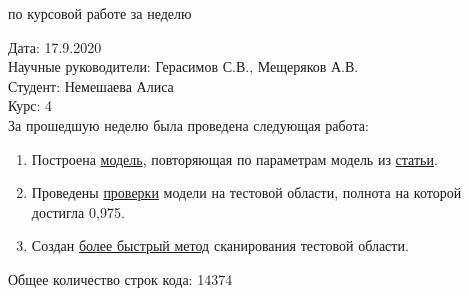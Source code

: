 \documentclass{article}
\begin{document}
\begin{center}{ по курсовой работе за неделю\\}\end{center}
Дата: 17.9.2020\\
Научные руководители: Герасимов С.В., Мещеряков А.В.\\
Студент: Немешаева Алиса\\
Курс: 4\\

\renewcommand{\labelitemi}{$\blacksquare$}
\renewcommand\labelitemii{$\square$}
За прошедшую неделю была проведена следующая работа:\\
\begin{enumerate}
    \item Построена \hyperlink{https://github.com/rt2122/data-segmentation-2/blob/master/Planck\_Unet/train\_unet\_planck\_z\_8\_filters.ipynb}{модель}, повторяющая по параметрам модель из \hyperlink{https://www.aanda.org/articles/aa/pdf/2020/02/aa36919-19.pdf}{статьи}.\\
    \item Проведены \hyperlink{https://github.com/rt2122/data-segmentation-2/blob/master/Planck\_Unet/scan\_planck\_z\_f8.ipynb}{проверки} модели на тестовой области, полнота на которой достигла 0,975.\\
    \item Создан \hyperlink{https://github.com/rt2122/data-segmentation-2/blob/master/modules/DS\_detector.py}{более быстрый метод} сканирования тестовой области.\\

\end{enumerate}

Общее количество строк кода: 14374\\
\end{document}

